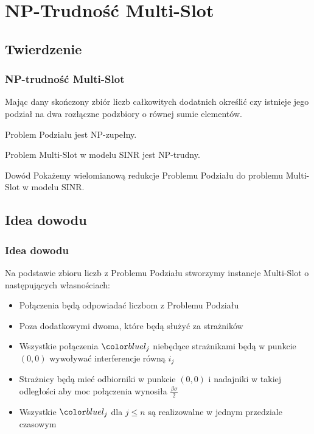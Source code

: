 \documentclass[polish, t,10pt]{beamer}
\begin{document}
\section{NP-Trudność Multi-Slot}
\subsection{Twierdzenie}
\begin{frame}
    \frametitle{NP-trudność Multi-Slot}
    \begin{definition}
        Mając dany skończony zbiór liczb całkowitych dodatnich określić czy istnieje jego podział na dwa rozłączne podzbiory o równej sumie elementów.
    \end{definition}
    \pause
    \begin{fact}
        Problem Podziału jest NP-zupełny.
    \end{fact}
    \pause
    \begin{theorem}
        Problem Multi-Slot w modelu SINR jest NP-trudny.
    \end{theorem}
    \pause
    \begin{block}{Dowód}
        Pokażemy wielomianową redukcje Problemu Podziału do problemu Multi-Slot w modelu SINR.
    \end{block}
\end{frame}
\subsection{Idea dowodu}
\begin{frame}
    \frametitle{Idea dowodu}
    Na podstawie zbioru liczb z Problemu Podziału stworzymy instancje Multi-Slot o następujących własnościach:
    \begin{itemize}
        \item Połączenia będą odpowiadać liczbom z Problemu Podziału
        \item Poza dodatkowymi dwoma, które będą służyć za strażników
        \item Wszystkie połączenia $\lj$ niebędące strażnikami będą w punkcie $(0, 0)$ wywoływać interferencje równą $i_j$
        \item Strażnicy będą mieć odbiorniki w punkcie $(0, 0)$ i nadajniki w takiej odległości aby moc połączenia wynosiła $\frac{\beta\sigma}{2}$
        \item Wszystkie $\lj$ dla $j \leq n$ są realizowalne w jednym przedziale czasowym
    \end{itemize}
\end{frame}
\end{document}
